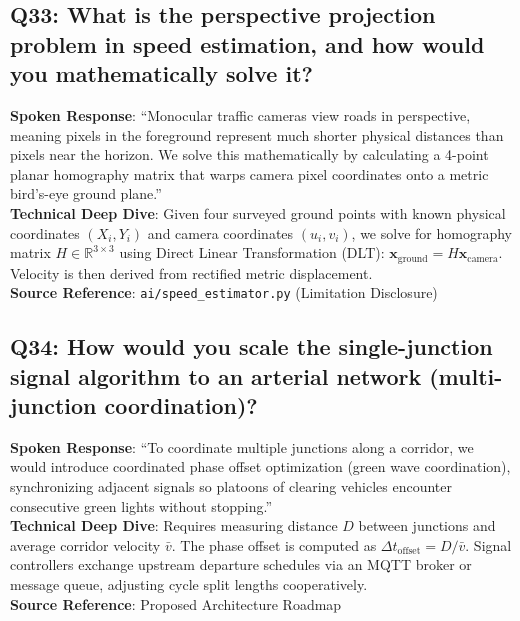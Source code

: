 \subsection*{Q33: What is the perspective projection problem in speed estimation, and how would you mathematically solve it?}
\begin{interviewbox}
\textbf{Spoken Response}: ``Monocular traffic cameras view roads in perspective, meaning pixels in the foreground represent much shorter physical distances than pixels near the horizon. We solve this mathematically by calculating a 4-point planar homography matrix that warps camera pixel coordinates onto a metric bird's-eye ground plane.''\\
\textbf{Technical Deep Dive}: Given four surveyed ground points with known physical coordinates $(X_i, Y_i)$ and camera coordinates $(u_i, v_i)$, we solve for homography matrix $H \in \mathbb{R}^{3 \times 3}$ using Direct Linear Transformation (DLT): $\mathbf{x}_{\text{ground}} = H \mathbf{x}_{\text{camera}}$. Velocity is then derived from rectified metric displacement.\\
\textbf{Source Reference}: \texttt{ai/speed\_estimator.py} (Limitation Disclosure)
\end{interviewbox}

\subsection*{Q34: How would you scale the single-junction signal algorithm to an arterial network (multi-junction coordination)?}
\begin{interviewbox}
\textbf{Spoken Response}: ``To coordinate multiple junctions along a corridor, we would introduce coordinated phase offset optimization (green wave coordination), synchronizing adjacent signals so platoons of clearing vehicles encounter consecutive green lights without stopping.''\\
\textbf{Technical Deep Dive}: Requires measuring distance $D$ between junctions and average corridor velocity $\bar{v}$. The phase offset is computed as $\Delta t_{\text{offset}} = D / \bar{v}$. Signal controllers exchange upstream departure schedules via an MQTT broker or message queue, adjusting cycle split lengths cooperatively.\\
\textbf{Source Reference}: Proposed Architecture Roadmap
\end{interviewbox}

